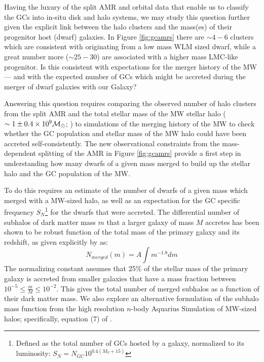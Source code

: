 \documentclass[useAMS,usenatbib]{mn2e}
\newcommand\msol{{{\cal M}_\odot}}
\begin{document}
Having the luxury of the split AMR and orbital data that enable us to classify
the GCs into in-situ disk and halo systems, we may study this question further
given the explicit link between the halo clusters and the mass(es) of their
progenitor host (dwarf) galaxies.  In Figure \ref{fig:gcamrs} there are 
$\sim 4-6$ clusters which
are consistent with originating from a low mass WLM sized dwarf, while a 
great number more ($\sim 25-30$) are associated with a higher mass LMC-like
progenitor.  Is this consistent with expectations for the merger history of
the MW --- and with the expected number of GCs which might be accreted during
the merger of dwarf galaxies with our Galaxy?

Answering this question requires comparing the observed number of halo 
clusters from the split AMR and the total stellar mass of
the MW stellar halo ($\sim 1 \pm 0.4 \times 10^{9} \msol$; 
\citealt{Morrison93,Bell08,Deason11}) to simulations of the 
merging history of the MW to check whether the GC population and stellar mass of 
the MW halo could have been accreted self-consistently.  The new observational
constraints from the mass-dependent splitting of the AMR in Figure 
\ref{fig:gcamrs} provide a first step in understanding how many
dwarfs of a given mass merged to build up the stellar
halo and the GC population of the MW.

To do this requires an estimate of the number of dwarfs of a given mass which
merged with a MW-sized halo, as well as an expectation for the GC specific
frequency $S_{N}$\footnote{Defined as the total number of GCs hosted by a
galaxy, normalized to its luminosity: $S_{N} = N_{GC}10^{0.4(M_{V} + 15)}$} for the
dwarfs that were accreted.  The differential number of subhalos of dark matter
mass $m$ that a larger galaxy of mass $M$ accretes has been shown to be robust
function of the total mass of the primary galaxy and its redshift, as given
explicitly by \cite{Giocoli08} as:
\begin{equation}
N_{merged}(m) = A \int m^{-1.8} dm
\end{equation}
The normalizing constant assumes that 25\% of the stellar mass of the primary
galaxy is accreted from smaller galaxies that have a mass fraction between
$10^{-5} \leq \frac{m}{M} \leq 10^{-2}$.  This gives the total number of merged
subhalos as a function of their dark matter mass.  We also explore an 
alternative formulation of the subhalo mass function from the 
high resolution $n$-body Aquarius Simulation of MW-sized halos; 
specifically, equation (7) of \cite{BK10}.
\end{document}
